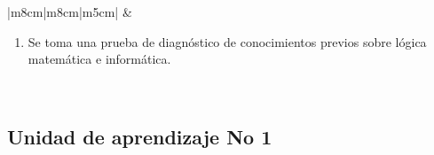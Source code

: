 \documentclass[a4pa<per,12pt,spanish]{article}
\begin{document}
\begin{tabular}[H]{|m{8cm}|m{8cm}|m{5cm}|}
                     &
  \begin{minipage}[H]{1.0\linewidth}
    {\setlength{\leftmargini}{10pt}
    \begin{enumerate}

    \item Se toma una prueba de diagnóstico de conocimientos previos sobre lógica matemática e informática. \vspace{0.5cm} 

    \end{enumerate}}
  \vspace{0.2cm}
  \end{minipage}


  \\ \hline

\end{tabular}

\newpage
\subsection{Unidad de aprendizaje No 1}
\label{sec:unid-de-aprend1}
\end{document}
